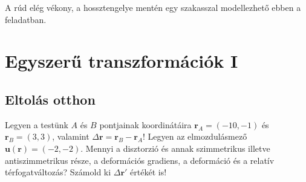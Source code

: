 \documentclass[12pt,a4paper]{scrartcl}
\let\mathbf\bm
\begin{document}
A rúd elég vékony, a hossztengelye mentén egy szakasszal modellezhető ebben a feladatban.

\section{Egyszerű transzformációk I}
\subsection{Eltolás otthon}
Legyen a testünk $A$ és $B$ pontjainak koordinátáira ${{\mathbf{r}}_A} = \left( { - 10, - 1} \right)$ és ${{\mathbf{r}}_B} = \left( { 3, 3} \right)$, valamint $\Delta {\mathbf{r}} = {{\mathbf{r}}_B} - {{\mathbf{r}}_A}$! Legyen az elmozdulásmező ${\mathbf{u}}\left( {\mathbf{r}} \right) = \left( { - 2, - 2} \right)$. Mennyi a disztorzió és annak szimmetrikus illetve antiszimmetrikus része, a deformációs gradiens, a deformáció és a relatív térfogatváltozás? Számold ki $\Delta {\mathbf{r}}'$ értékét is!
\end{document}
